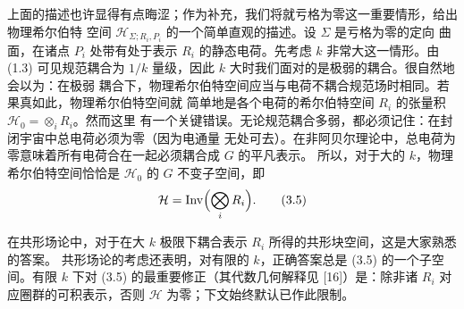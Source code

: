 \documentclass[11pt,a4paper]{article}
\begin{document}
上面的描述也许显得有点晦涩；作为补充，我们将就亏格为零这一重要情形，给出物理希尔伯特
空间 $\mathcal{H}_{\Sigma;R_i,P_i}$ 的一个简单直观的描述。设 $\Sigma$ 是亏格为零的定向
曲面，在诸点 $P_i$ 处带有处于表示 $R_i$ 的静态电荷。先考虑 $k$ 非常大这一情形。由 (1.3)
可见规范耦合为 $1/k$ 量级，因此 $k$ 大时我们面对的是极弱的耦合。很自然地会以为：在极弱
耦合下，物理希尔伯特空间应当与电荷不耦合规范场时相同。若果真如此，物理希尔伯特空间就
简单地是各个电荷的希尔伯特空间 $R_i$ 的张量积 $\mathcal{H}_0=\otimes_i R_i$。然而这里
有一个关键错误。无论规范耦合多弱，都必须记住：在封闭宇宙中总电荷必须为零（因为电通量
无处可去）。在非阿贝尔理论中，总电荷为零意味着所有电荷合在一起必须耦合成 $G$ 的平凡表示。
所以，对于大的 $k$，物理希尔伯特空间恰恰是 $\mathcal{H}_0$ 的 $G$ 不变子空间，即
\begin{equation}
    \mathcal{H}=\mathrm{Inv}\Bigl(\bigotimes_i R_i\Bigr).
    \tag{3.5}
\end{equation}


在共形场论中，对于在大 $k$ 极限下耦合表示 $R_i$ 所得的共形块空间，这是大家熟悉的答案。
共形场论的考虑还表明，对有限的 $k$，正确答案总是 (3.5) 的一个子空间。有限 $k$ 下对 (3.5)
的最重要修正（其代数几何解释见 [16]）是：除非诸 $R_i$ 对应圈群的可积表示，否则
$\mathcal{H}$ 为零；下文始终默认已作此限制。

\end{document}
